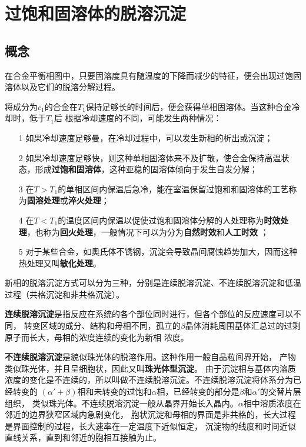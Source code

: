     \section{过饱和固溶体的脱溶沉淀}
        \subsection{概念}
            在合金平衡相图中，只要固溶度具有随温度的下降而减少的特征，便会出现过饱固溶体以及它们的脱溶分解过程。

            将成分为$c_1$的合金在$T_1$保持足够长的时间后，便会获得单相固溶体。当这种合金冷却时，低于$T_1$后
            根据冷却速度的不同，可能发生两种情况：
            \begin{itemize}
                \item[1] 如果冷却速度足够曼，在冷却过程中，可以发生新相的析出或沉淀；
                \item[2] 如果冷却速度足够快，则这种单相固溶体来不及扩散，使合金保持高温状态，形成\textbf{过饱和固溶体}，这种亚稳的固溶体倾向于发生自发分解；
                \item[3] 在$T>T_1$的单相区间内保温后急冷，能在室温保留过饱和和固溶体的工艺称为\textbf{固溶处理}或\textbf{淬火处理}；
                \item[4] 在$T<T_1$的温度区间内保温以促使过饱和固溶体分解的人处理称为\textbf{时效处理}，也称为\textbf{回火处理}，一般情况下可以为分为\textbf{自然时效}和\textbf{人工时效} ；
                \item[5] 对于某些合金，如奥氏体不锈钢，沉淀会导致晶间腐蚀趋势加大，因而这种热处理又叫\textbf{敏化处理}。
            \end{itemize}

            新相的脱溶沉淀方式可以分为三种，分别是连续脱溶沉淀、不连续脱溶沉淀和低温过程（共格沉淀和非共格沉淀）。

            \textbf{连续脱溶沉淀}是指反应在系统的各个部位同时进行，但各个部位的反应速度可以不同，
            转变区域的成分、结构和母相不同，孤立的$\beta$晶体消耗周围基体汇总过的过剩原子而长大，母相的浓度连续的变化为新相
            浓度。

            \textbf{不连续脱溶沉淀}是貌似珠光体的脱溶作用。这种作用一般自晶粒间界开始，
            产物类似珠光体，并且呈细胞状，因此又叫\textbf{珠光体型沉淀}。
            由于沉淀相与基体内溶质浓度的变化是不连续的，所以叫做不连续脱溶沉淀。不连续脱溶沉淀将体系分为已经转变的
            $(\alpha'+\beta)$相和未转变的过饱和$\alpha$相，已经转变的部分是$\beta$和$\alpha'$的交替片层组织，
            类似珠光体。不连续脱溶沉淀一般从晶界开始长入晶内。$\alpha$相中溶质浓度在邻近的边界狭窄区域内急剧变化，
            胞状沉淀和母相的界面是非共格的，长大过程是界面控制的过程，长大速率在一定温度下近似恒定，
            沉淀物的线度和时间近似直线关系，直到和邻近的胞相互接触为止。

